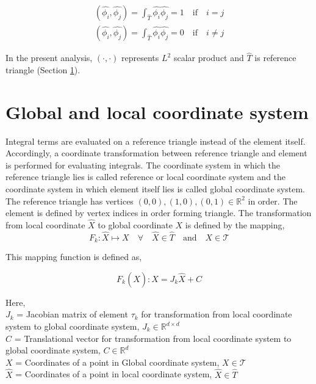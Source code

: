 \documentclass[a4paper]{book}
\begin{document}
\begin{equation}
\begin{split}
(\hat{\phi_i } , \hat{\phi_j}) = \int_{\hat{T}} \hat{\phi_i} \hat{\phi_j} = 1 \quad \textrm{if} \quad i = j \\
(\hat{\phi_i } , \hat{\phi_j}) = \int_{\hat{T}} \hat{\phi_i} \hat{\phi_j} = 0 \quad \textrm{if} \quad i \neq j 
\end{split}
\end{equation}

In the present analysis, $(\cdot,\cdot)$ represents $L^2$ scalar product and $\hat{T}$ is reference triangle (Section \ref{section_glob_loc}). 

\section{Global and local coordinate system} \label{section_glob_loc}

Integral terms are evaluated on a reference triangle instead of the element itself. Accordingly, a coordinate transformation between reference triangle and element is performed for evaluating integrals. The coordinate system in which the reference triangle lies is called reference or local coordinate system and the coordinate system in which element itself lies is called global coordinate system. The reference triangle has vertices $(0,0),(1,0),(0,1) \in \mathbb{R}^2$ in order. The element is defined by vertex indices in order forming triangle. The transformation from local coordinate $\hat{X}$ to global coordinate $X$ is defined by the mapping,
\begin{equation}\label{local global mapping}
F_k:\hat{X} \mapsto X \quad \forall \quad \hat{X} \in \hat{T} \quad \textrm{and} \quad X \in \mathcal{T}
\end{equation}

This mapping function is defined as,

\begin{equation}\label{local global mapping equation}
F_k(\hat{X}): X = J_k \hat{X} + C
\end{equation}

Here,
\\
$J_k$ = Jacobian matrix of element $\tau_k$ for transformation from local coordinate system to global coordinate system, $J_k \in \mathbb{R}^{d \times d}$\\
$C$ = Translational vector for transformation from local coordinate system to global coordinate system, $C \in \mathbb{R}^d$\\
$X$ = Coordinates of a point in Global coordinate system, $X \in \mathcal{T}$ \\
$\hat{X}$ = Coordinates of a point in local coordinate system, $\hat{X} \in \hat{T}$\\
\end{document}

